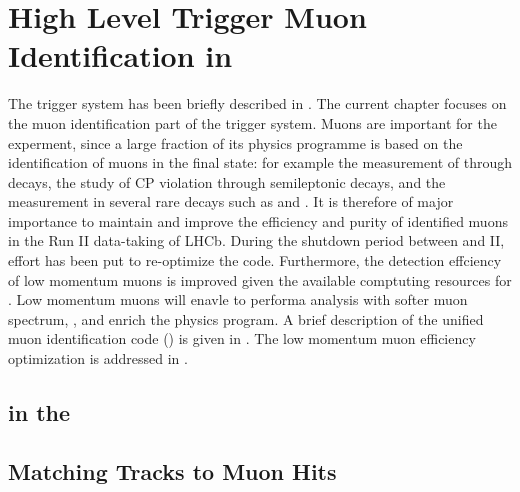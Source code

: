 \chapter{High Level Trigger Muon Identification in \runtwo}
\label{Muon_id_hlt}

The \lhcb trigger system has been briefly described in . The current chapter focuses on the muon identification
part of the trigger system. Muons are important for the \lhcb experment, since a large fraction of its physics programme is based on
the identification of muons in the final state: for example the measurement of \phis through \BsJpsiPhi decays, the study of CP
violation through semileptonic decays, and the measurement
in several rare decays such as \BdKstmumu and \Bsmm. It is therefore of major importance to maintain and improve the efficiency
and purity of identified muons in the Run II data-taking of LHCb. During the shutdown period between \runone and II, effort has
been put to re-optimize the \muonID code. Furthermore, the detection effciency of low momentum muons is improved given the available
comptuting resources for \runtwo. Low momentum muons will enavle to performa analysis with softer muon spectrum, \eg \cite{LHCB-CONF-2016-013-001,LHCb-CONF-2016-012},
and enrich the \lhcb physics program. A brief description of the unified muon identification code (\muonID) is given in .
The low momentum muon efficiency optimization is addressed in .

\section{\hltone \muonID in the \lhc \runtwo}
\label{muid_hlt1}


\section{Matching \velo Tracks to Muon Hits}
\label{mvm_algorrithm}

